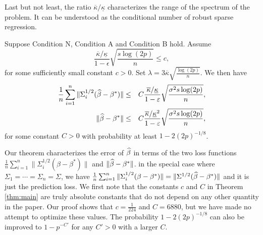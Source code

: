 Last but not least, the ratio $\overline{\kappa}/\underline{\kappa}$ characterizes the range of the spectrum of the problem. It can be understood as the conditional number of robust sparse regression.

\begin{thm}\label{thm:main}
Suppose Condition N, Condition A and Condition B hold. Assume
$$\frac{\overline{\kappa}/\underline{\kappa}}{1-\epsilon}\sqrt{\frac{s\log(2p)}{n}}\leq c,$$
for some sufficiently small constant $c>0$. Set $\lambda=3\overline{\kappa}\sqrt{\frac{\log(2p)}{n}}$. We then have
\begin{eqnarray*}
\frac{1}{n}\sum_{i=1}^n\|\Sigma_i^{1/2}(\wh{\beta}-\beta^*)\| &\leq& C\frac{\overline{\kappa}/\underline{\kappa}}{1-\epsilon}\sqrt{\frac{\sigma^2s\log(2p)}{n}}, \\
\|\wh{\beta}-\beta^*\| &\leq& C\frac{\overline{\kappa}/\underline{\kappa}^2}{1-\epsilon}\sqrt{\frac{\sigma^2s\log(2p)}{n}},
\end{eqnarray*}
for some constant $C>0$ with probability at least $1-2(2p)^{-1/8}$.
\end{thm}

Our theorem characterizes the error of $\widehat{\beta}$ in terms of the two loss functions $\frac{1}{n}\sum_{i=1}^n\|\Sigma_i^{1/2}(\beta-\beta^*)\|$ and $\|\widehat{\beta}-\beta^*\|$. in the special case where $\Sigma_1=\cdots=\Sigma_n=\Sigma$, we have $\frac{1}{n}\sum_{i=1}^n\|\Sigma_i^{1/2}(\beta-\beta^*)\|=\|\Sigma^{1/2}(\widehat{\beta}-\beta^*)\|$ and it is just the prediction loss. We first note that the constants $c$ and $C$ in Theorem \ref{thm:main} are truly absolute constants that do not depend on any other quantity in the paper. Our proof shows that $c=\frac{1}{224}$ and $C=6880$, but we have made no attempt to optimize these values. The probability $1-2(2p)^{-1/8}$ can also be improved to $1-p^{-C'}$ for any $C'>0$ with a larger $C$.

